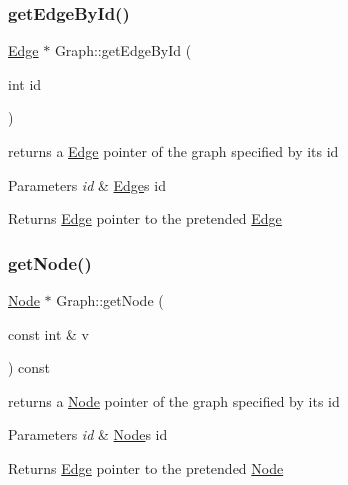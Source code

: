 \subsubsection{\texorpdfstring{get\+Edge\+By\+Id()}{getEdgeById()}}
{\footnotesize\ttfamily \hyperlink{class_edge}{Edge} $\ast$ Graph\+::get\+Edge\+By\+Id (\begin{DoxyParamCaption}\item[{int}]{id }\end{DoxyParamCaption})}



returns a \hyperlink{class_edge}{Edge} pointer of the graph specified by its id 


\begin{DoxyParams}{Parameters}
{\em id} & \hyperlink{class_edge}{Edge}\textquotesingle{}s id \\
\hline
\end{DoxyParams}
\begin{DoxyReturn}{Returns}
\hyperlink{class_edge}{Edge} pointer to the pretended \hyperlink{class_edge}{Edge} 
\end{DoxyReturn}
\mbox{\label{class_graph_ae36f4cc1d89f8ea4fa79047769df3d81}} 
\subsubsection{\texorpdfstring{get\+Node()}{getNode()}}
{\footnotesize\ttfamily \hyperlink{class_node}{Node} $\ast$ Graph\+::get\+Node (\begin{DoxyParamCaption}\item[{const int \&}]{v }\end{DoxyParamCaption}) const}



returns a \hyperlink{class_node}{Node} pointer of the graph specified by its id 


\begin{DoxyParams}{Parameters}
{\em id} & \hyperlink{class_node}{Node}\textquotesingle{}s id \\
\hline
\end{DoxyParams}
\begin{DoxyReturn}{Returns}
\hyperlink{class_edge}{Edge} pointer to the pretended \hyperlink{class_node}{Node} 
\end{DoxyReturn}
\mbox{\label{class_graph_ad0e4a55a991de20c7d1ad31210cfc575}} 
